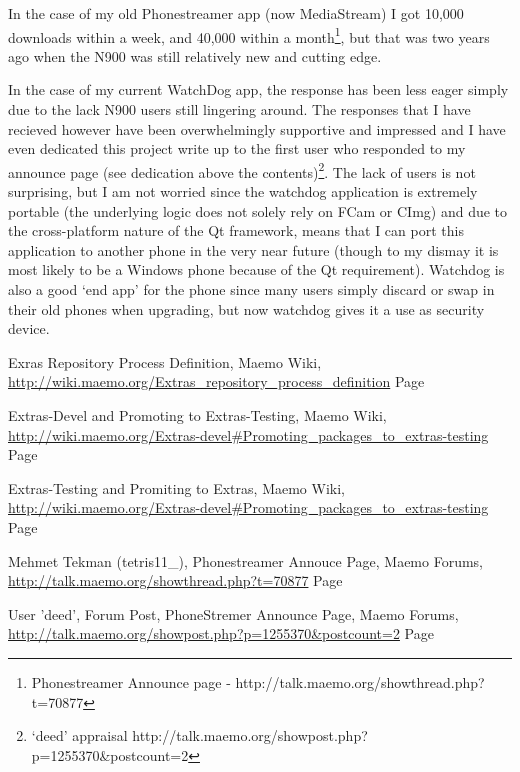 In the case of my old Phonestreamer app (now MediaStream) I got 10,000 downloads within a week, and 40,000 within a month\footnote{Phonestreamer Announce page - http://talk.maemo.org/showthread.php?t=70877}\label{ref:phonser}, but that was two years ago when the N900 was still relatively new and cutting edge.

In the case of my current WatchDog app, the response has been less eager simply due to the lack N900 users still lingering around. The responses that I have recieved however have been overwhelmingly supportive and impressed and I have even dedicated this project write up to the first user who responded to my announce page (see dedication above the contents)\footnote{‘deed’ appraisal http://talk.maemo.org/showpost.php?p=1255370\&postcount=2}\label{ref:appraisal}. The lack of users is not surprising, but I am not worried since the watchdog application is extremely portable (the underlying logic does not solely rely on FCam or CImg) and due to the cross-platform nature of the Qt framework, means that I can port this application to another phone in the very near future (though to my dismay it is most likely to be a Windows phone because of the Qt requirement). Watchdog is also a good ‘end app’ for the phone since many users simply discard or swap in their old phones when upgrading, but now watchdog gives it a use as security device.

\begin{thebibliography}{9}
Exras Repository Process Definition, Maemo Wiki,
\url{http://wiki.maemo.org/Extras_repository_process_definition}
Page~\pageref{ref:repproc}

Extras-Devel and Promoting to Extras-Testing, Maemo Wiki,
\url{http://wiki.maemo.org/Extras-devel#Promoting_packages_to_extras-testing}
Page~\pageref{ref:promtest}

Extras-Testing and Promiting to Extras, Maemo Wiki,
\url{http://wiki.maemo.org/Extras-devel#Promoting_packages_to_extras-testing}
Page~\pageref{ref:promext}

Mehmet Tekman (tetris11\_), Phonestreamer Annouce Page, Maemo Forums,
\url{http://talk.maemo.org/showthread.php?t=70877}
Page~\pageref{ref:phonser}

User 'deed', Forum Post, PhoneStremer Announce Page, Maemo Forums,
\url{http://talk.maemo.org/showpost.php?p=1255370&postcount=2}
Page~\pageref{ref:appraisal}

\end{thebibliography}